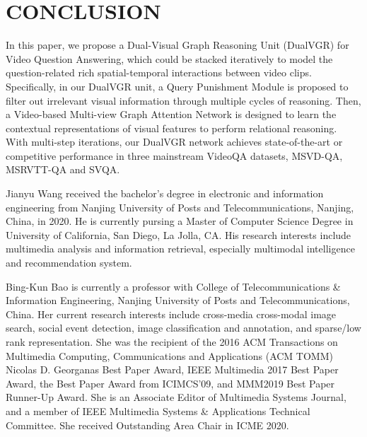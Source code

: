 \documentclass[journal]{IEEEtran}
\begin{document}
\section{CONCLUSION}
In this paper, we propose a Dual-Visual Graph Reasoning Unit (DualVGR) for Video Question Answering, which could be stacked iteratively to model the question-related rich spatial-temporal interactions between video clips. Specifically, in our DualVGR unit, a Query Punishment Module is proposed to filter out irrelevant visual information through multiple cycles of reasoning. Then, a Video-based Multi-view Graph Attention Network is designed to learn the contextual representations of visual features to perform relational reasoning. With multi-step iterations, our DualVGR network achieves state-of-the-art or competitive performance in three mainstream VideoQA datasets, MSVD-QA, MSRVTT-QA and SVQA.



\ifCLASSOPTIONcaptionsoff
  \newpage
\fi









\small

    



\begin{IEEEbiography}{Jianyu Wang}
received the bachelor's degree in electronic and information engineering from Nanjing University of Posts and Telecommunications, Nanjing, China, in 2020. He is currently pursing a Master of Computer Science Degree in University of California, San Diego, La Jolla, CA. His research interests include multimedia analysis and information retrieval, especially multimodal intelligence and recommendation system.
\end{IEEEbiography}

\begin{IEEEbiography}{Bing-Kun Bao}
is currently a professor with College of Telecommunications \& Information Engineering, Nanjing University of Posts and Telecommunications, China. Her current research interests include cross-media cross-modal image search, social event detection, image classification and annotation, and sparse/low rank representation. She was the recipient of the 2016 ACM Transactions on Multimedia Computing, Communications and Applications (ACM TOMM) Nicolas D. Georganas Best Paper Award, IEEE Multimedia 2017 Best Paper Award, the Best Paper Award from ICIMCS’09, and MMM2019 Best Paper Runner-Up Award. She is an Associate Editor of Multimedia Systems Journal, and a member of IEEE Multimedia Systems \& Applications Technical Committee. She received Outstanding Area Chair in ICME 2020.
\end{IEEEbiography}
\end{document}
